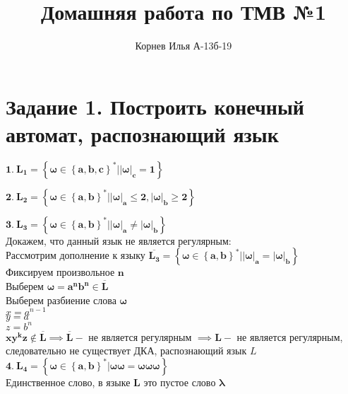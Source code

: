 \documentclass[12pt]{article}
\begin{document}
	\title{Домашняя работа по ТМВ №1}
	\author{Корнев Илья А-13б-19}
	\date{}
	\maketitle
	\setlength{\footskip}{60pt}
	\section*{Задание 1. Построить конечный автомат, распознающий язык}
	$\boldsymbol{1.\ L_1 =\left\{\omega \in \left\{a,b,c\right\}^* \vert |\omega|_c = 1 \right\}}$\\
	\begin{center}
	\end{center}
	$\boldsymbol{2.\ L_2 =\left\{\omega \in \left\{a,b\right\}^* \vert |\omega|_a \leq 2, |\omega|_b \geq 2 \right\}}$\\
	\begin{center}
	\end{center}
		$\boldsymbol{3.\ L_3 =\left\{\omega \in \left\{a,b\right\}^* \vert |\omega|_a \neq |\omega|_b \right\}}$\\
		Докажем, что данный язык не является регулярным:\\
		Рассмотрим дополнение к языку $\boldsymbol{\overline{L_3}=\left\{\omega \in \left\{a,b\right\}^* \vert |\omega|_a = |\omega|_b \right\}}$\\
		Фиксируем произвольное $\boldsymbol{n}$\\
		Выберем $\boldsymbol{\omega=a^nb^n \in \overline{L}}$\\
		Выберем разбиение слова $\boldsymbol{\omega}$\\
		$x=a^{n-1}$\\
		$y=a$\\
		$z=b^n$\\
		$\boldsymbol{xy^kz \notin \overline{L} \implies \overline{L}} - $ не является регулярным $\boldsymbol{\implies L} - $ не является регулярным, следовательно не существует ДКА, распознающий язык $L$\\

	$\boldsymbol{4.\ L_4 =\left\{\omega \in \left\{a,b\right\}^* \vert \omega\omega = \omega\omega\omega \right\}}$\\
	Единственное слово, в языке $\boldsymbol{L}$ это пустое слово $\boldsymbol{\lambda}$
	\begin{center}
	\end{center}
\end{document}
